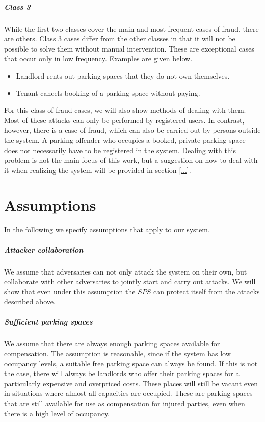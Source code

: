 \subparagraph{Class 3} While the first two classes cover the main and most frequent cases of fraud, there are others. Class 3 cases differ from the other classes in that it will not be possible to solve them without manual intervention. These are exceptional cases that occur only in low frequency. Examples are given below.
\begin{itemize}
\item Landlord rents out parking spaces that they do not own themselves.
\item Tenant cancels booking of a parking space without paying.
\end{itemize}
For this class of fraud cases, we will also show methods of dealing with them.\\

Most of these attacks can only be performed by registered users. In contrast, however, there is a case of fraud, which can also be carried out by persons outside the system. A parking offender who occupies a booked, private parking space does not necessarily have to be registered in the system. Dealing with this problem is not the main focus of this work, but a suggestion on how to deal with it when realizing the system will be provided in section \ref{...}.

\section{Assumptions}
In the following we specify assumptions that apply to our system.\\

\subparagraph{Attacker collaboration} We assume that adversaries can not only attack the system on their own, but collaborate with other adversaries to jointly start and carry out attacks. We will show that even under this assumption the $SPS$ can protect itself from  the attacks described above.

\subparagraph{Sufficient parking spaces} We assume that there are always enough parking spaces available for compensation. The assumption is reasonable, since if the system has low occupancy levels, a suitable free parking space can always be found. If this is not the case, there will always be landlords  who offer their parking spaces for a particularly expensive and overpriced costs. These places will still be vacant even in situations where almost all capacities are occupied. These are parking spaces that are still available for use as compensation for injured parties, even when there is a high level of occupancy. 

